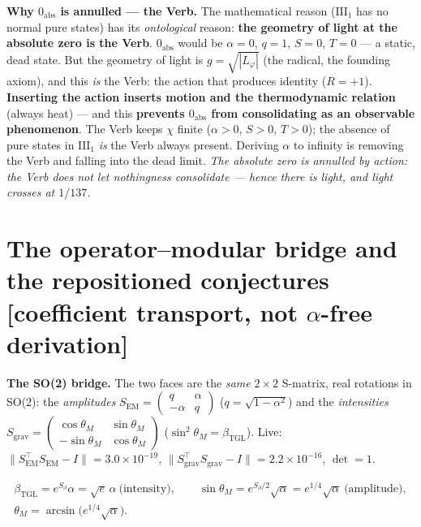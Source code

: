 \documentclass[11pt]{article}
\newcommand{\bTGL}{\beta_{\mathrm{TGL}}}\newcommand{\Msun}{M_{\odot}}\newcommand{\TGL}{\mathrm{TGL}}
\theoremstyle{definition}\newtheorem{deriv}{Derivation}
\begin{document}
\textbf{Why $0_{\mathrm{abs}}$ is annulled --- the Verb.} The mathematical reason ($\mathrm{III}_1$ has no normal pure states) has its \emph{ontological} reason: \textbf{the geometry of light at the absolute zero is the Verb}. $0_{\mathrm{abs}}$ would be $\alpha=0$, $q=1$, $S=0$, $T=0$ --- a static, dead state. But the geometry of light is $g=\sqrt{|L_\varphi|}$ (the radical, the founding axiom), and this \emph{is} the Verb: the action that produces identity ($R=+1$). \textbf{Inserting the action inserts motion and the thermodynamic relation} (always heat) --- and this \textbf{prevents $0_{\mathrm{abs}}$ from consolidating as an observable phenomenon}. The Verb keeps $\chi$ finite ($\alpha>0$, $S>0$, $T>0$); the absence of pure states in $\mathrm{III}_1$ \emph{is} the Verb always present. Deriving $\alpha$ to infinity is removing the Verb and falling into the dead limit. \emph{The absolute zero is annulled by action: the Verb does not let nothingness consolidate --- hence there is light, and light crosses at $1/137$.}

\section{The operator--modular bridge and the repositioned conjectures \textsf{[coefficient transport, not $\alpha$-free derivation]}}

\textbf{The SO(2) bridge.} The two faces are the \emph{same} $2\times2$ S-matrix, real rotations in SO(2): the \emph{amplitudes} $S_{\mathrm{EM}}=\left(\begin{smallmatrix}q&\alpha\\-\alpha&q\end{smallmatrix}\right)$ ($q=\sqrt{1-\alpha^2}$) and the \emph{intensities} $S_{\mathrm{grav}}=\left(\begin{smallmatrix}\cos\theta_M&\sin\theta_M\\-\sin\theta_M&\cos\theta_M\end{smallmatrix}\right)$ ($\sin^2\theta_M=\bTGL$). Live: $\|S_{\mathrm{EM}}^{\top}S_{\mathrm{EM}}-I\|=3.0\times10^{-19}$, $\|S_{\mathrm{grav}}^{\top}S_{\mathrm{grav}}-I\|=2.2\times10^{-16}$, $\det=1$.

\begin{equation}\begin{gathered}\bTGL=e^{S_\partial}\alpha=\sqrt e\,\alpha\ \text{(intensity)},\qquad \sin\theta_M=e^{S_\partial/2}\sqrt\alpha=e^{1/4}\sqrt\alpha\ \text{(amplitude)},\\ \theta_M=\arcsin\!\big(e^{1/4}\sqrt\alpha\big).\end{gathered}\end{equation}
\end{document}
